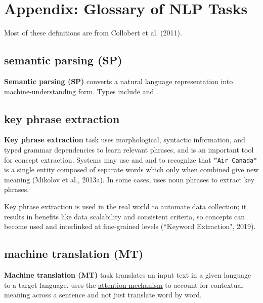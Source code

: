 \section{Appendix: Glossary of NLP Tasks} \label{app:Appendix_NLPTasks}

Most of these definitions are from Collobert et al. (2011). 


\subsection{semantic parsing (SP)} \label{nlptask:semanticparsingSP}

\textbf{Semantic parsing (SP)} converts a natural language representation into machine-understanding form. Types include  and .



\subsection{key phrase extraction} \label{nlptask:keyphraseextraction}

\textbf{Key phrase extraction} task uses morphological,  syntactic information, and typed grammar dependencies to learn relevant phrases, and is an important tool for concept extraction. Systems may use  and  and  to recognize that \texttt{``Air Canada"} is a single entity composed of separate words which only when combined give new meaning (Mikolov et al., 2013a). In some cases,  uses noun phrases to extract key phrases. 

Key phrase extraction is used in the real world to automate data collection; it results in benefits like data scalability and consistent criteria, so concepts can become used and interlinked at fine-grained levels (``Keyword Extraction", 2019). 



\subsection{machine translation (MT)} \label{nlptask:machinetranslationMT}

\textbf{Machine translation (MT)} task translates an input text in a given language to a target language.  uses the \hyperref[sec:AttentionMechanism]{attention mechanism} to account for contextual meaning across a sentence and not just translate word by word. 

